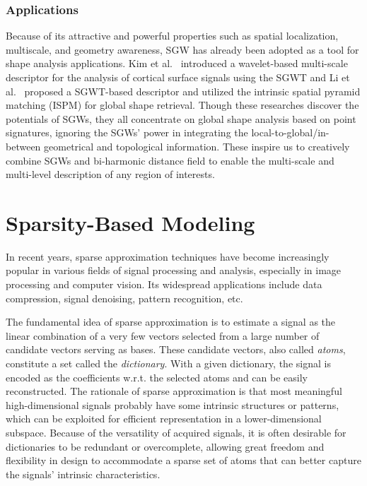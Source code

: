 \subsubsection*{Applications}

Because of its attractive and powerful properties such as
spatial localization, multiscale, and geometry awareness, SGW has
already been adopted as a tool for shape analysis applications.
Kim et al.~\cite{Kim:2012,Kim:2014}
introduced a wavelet-based multi-scale descriptor for the analysis of
cortical surface signals using the SGWT and Li et al.~\cite{Li:2013}
proposed a SGWT-based descriptor and utilized the intrinsic spatial
pyramid matching (ISPM) for global shape retrieval. Though these
researches discover the potentials of SGWs, they all concentrate on
global shape analysis based on point signatures, ignoring the SGWs'
power in integrating the local-to-global/in-between geometrical and
topological information. These inspire us to
creatively combine SGWs and bi-harmonic distance field to enable the
multi-scale and multi-level description of any region of interests.

\section{Sparsity-Based Modeling}

In recent years, sparse approximation techniques have become
increasingly popular in various fields of signal processing and
analysis, especially in image processing and computer vision. Its
widespread applications include data compression, signal denoising,
pattern recognition, etc.

The fundamental idea of sparse approximation is to estimate a signal
as the linear combination of a very few vectors selected from a large
number of candidate vectors serving as bases. These candidate vectors,
also called \emph{atoms}, constitute a set called the
\emph{dictionary}. With a given dictionary, the signal is encoded as
the coefficients w.r.t. the selected atoms and can be easily
reconstructed. The rationale of sparse
approximation is that most meaningful high-dimensional signals probably
have some intrinsic structures or patterns, which can be exploited for
efficient representation in a lower-dimensional subspace. Because of
the versatility of acquired signals, it is often desirable for dictionaries to
be redundant or overcomplete, allowing great freedom and flexibility in
design to accommodate a sparse set of atoms that can better capture
the signals' intrinsic characteristics.

